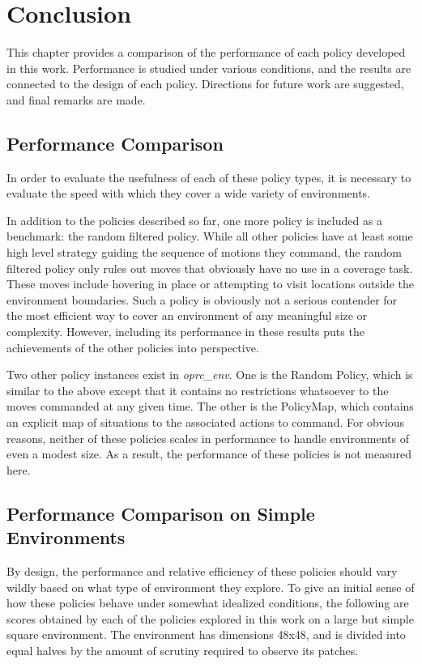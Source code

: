 \chapter{Conclusion}

This chapter provides a comparison of the performance of each policy developed in this work. Performance is studied under various conditions, and the results are connected to the design of each policy. Directions for future work are suggested, and final remarks are made.

\section{Performance Comparison}

In order to evaluate the usefulness of each of these policy types, it is necessary to evaluate the speed with which they cover a wide variety of environments.

In addition to the policies described so far, one more policy is included as a benchmark: the random filtered policy. While all other policies have at least some high level strategy guiding the sequence of motions they command, the random filtered policy only rules out moves that obviously have no use in a coverage task. These moves include hovering in place or attempting to visit locations outside the environment boundaries. Such a policy is obviously not a serious contender for the most efficient way to cover an environment of any meaningful size or complexity. However, including its performance in these results puts the achievements of the other policies into perspective.

Two other policy instances exist in \textit{oprc\_env}. One is the Random Policy, which is similar to the above except that it contains no restrictions whatsoever to the moves commanded at any given time. The other is the PolicyMap, which contains an explicit map of situations to the associated actions to command. For obvious reasons, neither of these policies scales in performance to handle environments of even a modest size. As a result, the performance of these policies is not measured here.

\section{Performance Comparison on Simple Environments}

By design, the performance and relative efficiency of these policies should vary wildly based on what type of environment they explore. To give an initial sense of how these policies behave under somewhat idealized conditions, the following are scores obtained by each of the policies explored in this work on a large but simple square environment. The environment has dimensions 48x48, and is divided into equal halves by the amount of scrutiny required to observe its patches.


